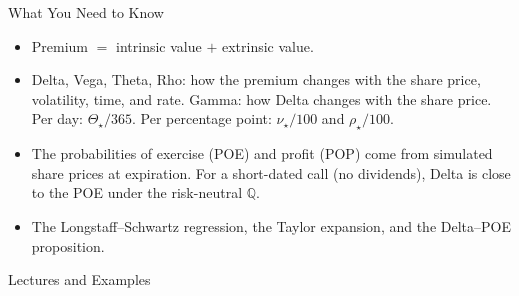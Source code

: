 \documentclass[aspectratio=169,11pt]{beamer}
\newcommand{\Q}{\mathbb{Q}}
\newcommand{\repo}{https://github.com/varnerlab/CHEME-5660-CourseRepository-Fall-2026/blob/main/lectures/week-10/L10a}
\begin{document}
\begin{frame}{What You Need to Know}
  \vspace{0.3em}
  {\large\textbf{}}
  \begin{itemize}\setlength{\itemsep}{0.4em}
    \item Premium $=$ intrinsic value $+$ extrinsic value.
    \item Delta, Vega, Theta, Rho: how the premium changes with the share
      price, volatility, time, and rate. Gamma: how Delta changes with the
      share price. Per day: $\Theta_{\star}/365$. Per percentage point:
      $\nu_{\star}/100$ and $\rho_{\star}/100$.
    \item The probabilities of exercise (POE) and profit (POP) come from
      simulated share prices at expiration. For a short-dated call (no
      dividends), Delta is close to the POE under the risk-neutral $\Q$.
  \end{itemize}

  \vspace{0.5em}
  {\large\textbf{}} 
  \begin{itemize}\setlength{\itemsep}{0.3em}
    \item The Longstaff--Schwartz regression, the Taylor expansion, and the
      Delta--POE proposition.
  \end{itemize}
\end{frame}

\begin{frame}{Lectures and Examples}
  \vspace{0.3em}
  {\normalsize\textbf{}\par\small
  \href{\repo/CHEME-5660-L10a-Lecture-American-Derivatives-Greeks-Fall-2026.ipynb}{}}

  \vspace{0.6em}
  {\normalsize\textbf{}\par\small
  \href{\repo/CHEME-5660-L10a-Example-LSM-Premium-Fall-2026.ipynb}{}}

  \vspace{0.45em}
  {\normalsize\textbf{}\par\small
  \href{\repo/CHEME-5660-L10a-Example-Greeks-PutCall-Fall-2026.ipynb}{}}

  \vspace{0.45em}
  {\normalsize\textbf{}\par\small
  \href{\repo/CHEME-5660-L10a-Example-POE-POP-Call-Fall-2026.ipynb}{}}

  \vspace{0.45em}
  {\normalsize\textbf{}\par\small
  \href{\repo/CHEME-5660-L10a-Example-ExtrinsicValue-Fall-2026.ipynb}{}}
\end{frame}
\end{document}
